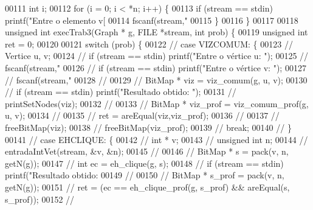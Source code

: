\begin{DoxyCode}
{00111         \textcolor{keywordtype}{int} i;
00112         \textcolor{keywordflow}{for} (i = 0; i < *n; i++) \{
00113                 \textcolor{keywordflow}{if} (stream == stdin) printf(\textcolor{stringliteral}{"Entre o elemento v[%
00114                 fscanf(stream,\textcolor{stringliteral}{"%
00115         \}
00116 \}
00117 
00118 \textcolor{keywordtype}{unsigned} \textcolor{keywordtype}{int} execTrab3(Graph * g, FILE *stream, \textcolor{keywordtype}{int} prob) \{
00119         \textcolor{keywordtype}{unsigned} \textcolor{keywordtype}{int} ret = 0;
00120 
00121         \textcolor{keywordflow}{switch} (prob) \{
00122 \textcolor{comment}{//      case VIZCOMUM: \{}
00123 \textcolor{comment}{//              Vertice u, v;}
00124 \textcolor{comment}{//              if (stream == stdin) printf("Entre o vértice u: ");}
00125 \textcolor{comment}{//              fscanf(stream,"%
00126 \textcolor{comment}{//              if (stream == stdin) printf("Entre o vértice v: ");}
00127 \textcolor{comment}{//              fscanf(stream,"%
00128 \textcolor{comment}{//}
00129 \textcolor{comment}{//              BitMap * viz = viz\_comum(g, u, v);}
00130 \textcolor{comment}{//              if (stream == stdin) printf("Resultado obtido: ");}
00131 \textcolor{comment}{//              printSetNodes(viz);}
00132 \textcolor{comment}{//}
00133 \textcolor{comment}{//              BitMap * viz\_prof = viz\_comum\_prof(g, u, v);}
00134 \textcolor{comment}{//}
00135 \textcolor{comment}{//              ret = areEqual(viz,viz\_prof);}
00136 \textcolor{comment}{//}
00137 \textcolor{comment}{//              freeBitMap(viz);}
00138 \textcolor{comment}{//              freeBitMap(viz\_prof);}
00139 \textcolor{comment}{//              break;}
00140 \textcolor{comment}{//      \}}
00141 \textcolor{comment}{//      case EHCLIQUE: \{}
00142 \textcolor{comment}{//              int * v;}
00143 \textcolor{comment}{//              unsigned int n;}
00144 \textcolor{comment}{//              entradaIntVet(stream, &v, &n);}
00145 \textcolor{comment}{//}
00146 \textcolor{comment}{//              BitMap * s = pack(v, n, getN(g));}
00147 \textcolor{comment}{//              int ec = eh\_clique(g, s);}
00148 \textcolor{comment}{//              if (stream == stdin) printf("Resultado obtido: %
00149 \textcolor{comment}{//}
00150 \textcolor{comment}{//              BitMap * s\_prof = pack(v, n, getN(g));}
00151 \textcolor{comment}{//              ret = (ec == eh\_clique\_prof(g, s\_prof) && areEqual(s, s\_prof));}
00152 \textcolor{comment}{//}
}}}}}}
\end{DoxyCode}

